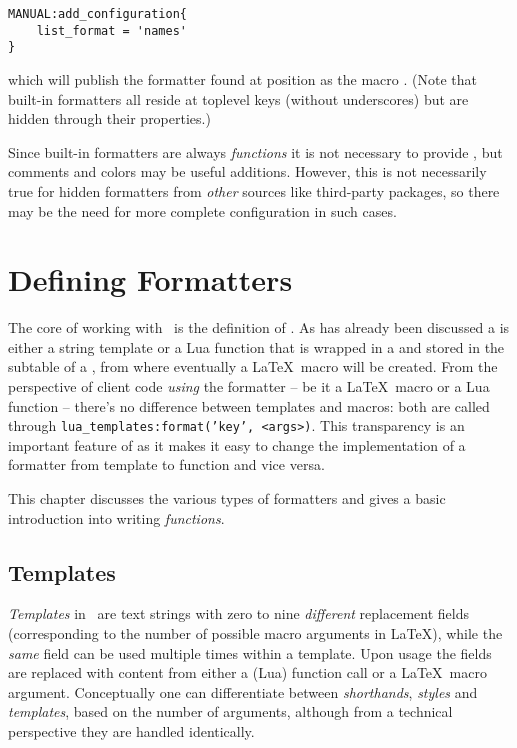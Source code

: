 \documentclass[12pt]{scrartcl}
\begin{document}
\begin{verbatim}
MANUAL:add_configuration{
	list_format = 'names'
}
\end{verbatim}

\noindent which will publish the formatter found at position  as the macro .  (Note that built-in formatters all reside at toplevel keys (without underscores) but are hidden through their  properties.)

Since built-in formatters are always \emph{functions} it is not necessary to
provide , but comments and colors may be useful additions.
However, this is not necessarily true for hidden formatters from \emph{other}
sources like third-party packages, so there may be the need for more complete
configuration in such cases.


\section{Defining Formatters}
\label{sec:defining-formatters}

The core of working with \luatemplates\ is the definition of
.  As has already been discussed a 
is either a string template or a Lua function that is wrapped in a
 and stored in the  subtable of a
, from where eventually a \LaTeX\ macro will be created.
From the perspective of client code \emph{using} the formatter -- be it a
\LaTeX\ macro or a Lua function -- there's no difference between templates and
macros: both are called through \texttt{lua_templates:format('key',
<args>)}.  This transparency is an important feature of \luatemplates
as it makes it easy to change the implementation of a formatter from template to
function and vice versa.

This chapter discusses the various types of formatters and gives a basic introduction into writing  \emph{functions}.


\subsection{Templates}
\label{sec:templates}

\emph{Templates} in \luatemplates\ are text strings with zero to nine
\emph{different} replacement fields (corresponding to the number of possible
macro arguments in \LaTeX), while the \emph{same} field can be used multiple
times within a template.  Upon usage the fields are replaced with content from
either a (Lua) function call or a \LaTeX\ macro argument.  Conceptually one can
differentiate between \emph{shorthands}, \emph{styles} and \emph{templates},
based on the number of arguments, although from a technical perspective they are
handled identically.
\end{document}
